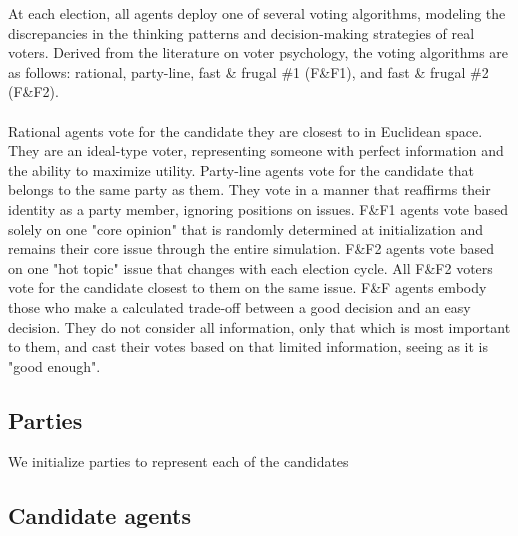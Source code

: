 At each election, all agents deploy one of several voting algorithms, modeling the
discrepancies in the thinking patterns and decision-making strategies of real voters.
Derived from the literature on voter psychology, the voting algorithms are as follows: 
rational, party-line, fast \& frugal \#1 (F\&F1), and fast \& frugal \#2 (F\&F2).
\\\\
Rational agents vote for the candidate they are closest to in Euclidean space. They are an
ideal-type voter, representing someone with perfect information and the ability to maximize 
utility. Party-line agents vote for the candidate that belongs to the same party as them. They vote in a manner that reaffirms their identity as a party member, ignoring positions on issues. F\&F1 agents vote based solely on one "core opinion" that is randomly determined at initialization and remains their core issue through the entire simulation. F\&F2 agents vote based on one "hot topic"
issue that changes with each election cycle. All F\&F2 voters vote for the candidate closest to them
on the same issue. F\&F agents embody those who make a calculated trade-off between a good decision and an easy decision. They do not consider all information, only that which is most important to them, and cast their votes based on that limited information, seeing as it is "good enough".


\subsection{Parties}


We initialize parties to represent each of the candidates

\subsection{Candidate agents}


